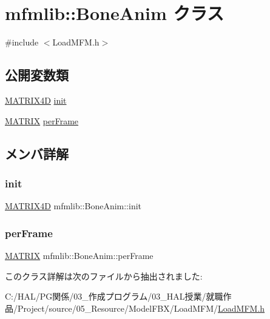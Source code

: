 \hypertarget{classmfmlib_1_1_bone_anim}{}\section{mfmlib\+:\+:Bone\+Anim クラス}
\label{classmfmlib_1_1_bone_anim}


{\ttfamily \#include $<$Load\+M\+F\+M.\+h$>$}

\subsection*{公開変数類}
\begin{DoxyCompactItemize}
\item 
\mbox{\hyperlink{structmfmlib_1_1_m_a_t_r_i_x4_d}{M\+A\+T\+R\+I\+X4D}} \mbox{\hyperlink{classmfmlib_1_1_bone_anim_a3c1f11f8db6142d65714e43d64b15d58}{init}}
\item 
\mbox{\hyperlink{classmfmlib_1_1_m_a_t_r_i_x}{M\+A\+T\+R\+IX}} \mbox{\hyperlink{classmfmlib_1_1_bone_anim_a31647fc544d8e6878209274519344ff3}{per\+Frame}}
\end{DoxyCompactItemize}


\subsection{メンバ詳解}
\mbox{\label{classmfmlib_1_1_bone_anim_a3c1f11f8db6142d65714e43d64b15d58}} 
\subsubsection{\texorpdfstring{init}{init}}
{\footnotesize\ttfamily \mbox{\hyperlink{structmfmlib_1_1_m_a_t_r_i_x4_d}{M\+A\+T\+R\+I\+X4D}} mfmlib\+::\+Bone\+Anim\+::init}

\mbox{\label{classmfmlib_1_1_bone_anim_a31647fc544d8e6878209274519344ff3}} 
\subsubsection{\texorpdfstring{per\+Frame}{perFrame}}
{\footnotesize\ttfamily \mbox{\hyperlink{classmfmlib_1_1_m_a_t_r_i_x}{M\+A\+T\+R\+IX}} mfmlib\+::\+Bone\+Anim\+::per\+Frame}



このクラス詳解は次のファイルから抽出されました\+:\begin{DoxyCompactItemize}
\item 
C\+:/\+H\+A\+L/\+P\+G関係/03\+\_\+作成プログラム/03\+\_\+\+H\+A\+L授業/就職作品/\+Project/source/05\+\_\+\+Resource/\+Model\+F\+B\+X/\+Load\+M\+F\+M/\mbox{\hyperlink{_load_m_f_m_8h}{Load\+M\+F\+M.\+h}}\end{DoxyCompactItemize}
